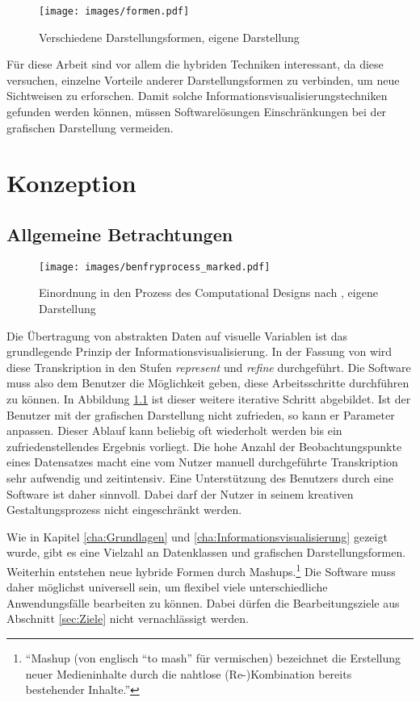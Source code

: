 \documentclass[a4paper, 
               12pt,
               DIV=calc,
               version=first,
               pdftex,
               headsepline,
               footsepline,
               bibtotocnumbered,
               liststotocnumbered]{scrreprt}
\begin{document}
\begin{figure}
\centering
\texttt{[image: images/formen.pdf]}
\caption{Verschiedene Darstellungsformen, eigene Darstellung}
\label{fig:formen}
\end{figure}

Für diese Arbeit sind vor allem die hybriden Techniken interessant, da diese versuchen,
einzelne Vorteile anderer Darstellungsformen zu verbinden, um neue Sichtweisen zu erforschen.
Damit solche Informationsvisualisierungstechniken gefunden werden können, müssen
Softwarelösungen Einschränkungen bei der grafischen Darstellung vermeiden.

\chapter{Konzeption}
\label{cha:Software}
\section{Allgemeine Betrachtungen}
\label{sec:AllgemeineBetrachtungen}
\begin{figure}
\centering
\texttt{[image: images/benfryprocess\_marked.pdf]}
\caption{Einordnung in den Prozess des Computational Designs nach \citep{BenFry}, eigene Darstellung}
\label{fig:benfryprocess_marked}
\end{figure}
Die Übertragung von abstrakten Daten auf visuelle Variablen ist das grundlegende Prinzip der
Informationsvisualisierung. In der Fassung von \cite{BenFry} wird diese Transkription in den
Stufen \textit{represent} und \textit{refine} durchgeführt. Die Software muss also dem Benutzer die Möglichkeit geben,
diese Arbeitsschritte durchführen zu können. In Abbildung \ref{fig:benfryprocess_marked} ist dieser weitere iterative Schritt
abgebildet. Ist der Benutzer mit der grafischen Darstellung nicht zufrieden, so kann er Parameter anpassen. Dieser Ablauf
kann beliebig oft wiederholt werden bis ein zufriedenstellendes Ergebnis vorliegt.
Die hohe Anzahl der Beobachtungspunkte eines Datensatzes macht eine vom Nutzer manuell durchgeführte Transkription
sehr aufwendig und zeitintensiv. Eine Unterstützung des Benutzers durch eine Software ist daher sinnvoll.
Dabei darf der Nutzer in seinem kreativen Gestaltungsprozess nicht eingeschränkt werden.

Wie in Kapitel \ref{cha:Grundlagen} und \ref{cha:Informationsvisualisierung} gezeigt wurde, gibt es eine Vielzahl an
Datenklassen und grafischen Darstellungsformen. Weiterhin entstehen neue hybride Formen durch Mashups.\footnote{"`Mashup (von
englisch "`to mash"' für vermischen) bezeichnet die Erstellung neuer Medieninhalte durch die nahtlose
(Re-)Kombination bereits bestehender Inhalte."'\citep{wiki_mashup}}
Die Software muss daher möglichst universell sein, um flexibel viele unterschiedliche Anwendungsfälle
bearbeiten zu können. Dabei dürfen die Bearbeitungsziele aus Abschnitt \ref{sec:Ziele} nicht
vernachlässigt werden.
\end{document}
